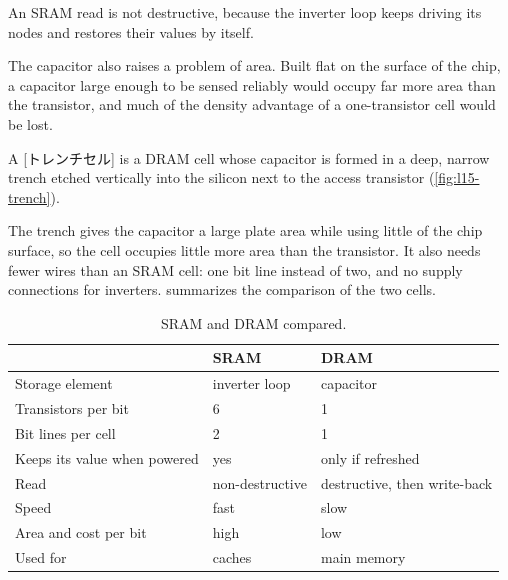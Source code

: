 \documentclass[../main.tex]{subfiles}
\begin{document}
An SRAM read is not destructive, because the inverter loop keeps driving its
nodes and restores their values by itself.

The capacitor also raises a problem of area.  Built flat on the surface of the
chip, a capacitor large enough to be sensed reliably would occupy far more
area than the transistor, and much of the density advantage of a
one-transistor cell would be lost.

\begin{definition}
  A [トレンチセル] is a DRAM cell whose capacitor is formed
  in a deep, narrow trench etched vertically into the silicon next to the
  access transistor (\cref{fig:l15-trench}).
\end{definition}

\begin{marginfigure}
  
  \caption{Cross-section of a trench cell (schematic).}
  \label{fig:l15-trench}
\end{marginfigure}

The trench gives the capacitor a large plate area while using little of the
chip surface, so the cell occupies little more area than the transistor.%
  It also needs fewer wires than an SRAM cell: one bit line instead
of two, and no supply connections for inverters.  
summarizes the comparison of the two cells.

\begin{table}[htbp]
  \centering\small
  \caption{SRAM and DRAM compared.}
  \label{tab:l15-sram-dram}
  \begin{tabular}{@{}lll@{}}
    \toprule
                              & SRAM           & DRAM \\
    \midrule
    Storage element           & inverter loop  & capacitor \\
    Transistors per bit       & 6              & 1 \\
    Bit lines per cell        & 2              & 1 \\
    Keeps its value when powered & yes         & only if refreshed \\
    Read                      & non-destructive & destructive, then write-back \\
    Speed                     & fast           & slow \\
    Area and cost per bit     & high           & low \\
    Used for                  & caches         & main memory \\
    \bottomrule
  \end{tabular}
\end{table}
\end{document}
